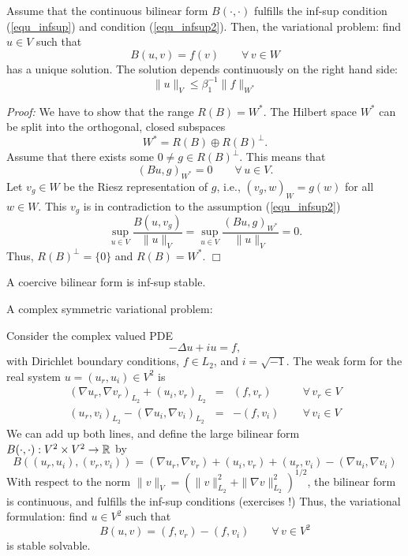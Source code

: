\begin{theorem} \label{theo_infsup} 
Assume that the continuous bilinear form $B(\cdot,\cdot)$ fulfills
the inf-sup condition (\ref{equ_infsup}) and condition (\ref{equ_infsup2}). 
Then, the variational problem: find $u \in V$ such that
\begin{equation} \label{equ_bigsystem}
B(u,v) = f(v) \qquad \forall \, v \in W
\end{equation}
has a unique solution. The solution depends continuously on the right hand
side:
$$
\| u \|_V \leq \beta_1^{-1} \| f \|_{W^\ast}
$$
\end{theorem}
{\em Proof:} We have to show that the range $R(B) = W^\ast$. The Hilbert
space $W^\ast$ can be split into the orthogonal, closed subspaces
$$
W^\ast = R(B) \oplus R(B)^\bot.
$$
Assume that there exists some $0 \neq g \in R(B)^\bot$. This means that
$$
(B u, g)_{W^\ast} = 0 \qquad \forall \, u \in V.
$$
Let $v_g \in W$ be the Riesz representation of $g$, i.e., $(v_g, w)_W = g(w)$ for all $w \in W$. This $v_g$ is in contradiction to the assumption 
(\ref{equ_infsup2})
$$
\sup_{u \in V} \frac{B(u,v_g)}{ \| u \|_V} = 
\sup_{u \in V} \frac{(Bu,g)_{W^\ast}}{ \| u \|_V} = 
0.
$$
Thus, $R(B)^\bot = \{ 0 \}$ and $R(B) = W^\ast$.
\hfill $\Box$

\begin{example}A coercive bilinear form is inf-sup stable.
\end{example}
\begin{example}A complex symmetric variational problem:
\end{example}
\noindent
Consider the complex valued PDE 
$$
-\Delta u + i u = f,
$$
with Dirichlet boundary conditions, $f \in L_2$, and $i = \sqrt{-1}$. The
weak form for the real system $u = (u_{r}, u_i) \in V^2$ is
\begin{equation}
\begin{array}{rcll}
(\nabla u_{r}, \nabla v_{r})_{L_2} + (u_i, v_{r})_{L_2} & = &
        (f,v_{r}) \qquad & \forall \, v_r \in V \\
(u_{r}, v_i)_{L_2} -(\nabla u_i, \nabla v_i)_{L_2} & = &
        -(f,v_i) & \forall \, v_i \in V
\end{array}
\end{equation}
We can add up both lines, and define the large bilinear form $B(\cdot,\cdot) : V^2 \times V^2 \rightarrow {\mathbb R}$ by
$$
B ((u_r,u_i), (v_r, v_i)) = 
(\nabla u_{r}, \nabla v_{r}) + (u_i, v_{r}) + (u_{r}, v_i) -(\nabla u_i, \nabla v_i)
$$
With respect to the norm $\|v\|_V = ( \| v \|_{L_2}^2 + \| \nabla v \|_{L_2}^2)^{1/2}$, the bilinear form is continuous, and fulfills the inf-sup conditions
(exercises !)
Thus, the variational formulation: find $u \in V^2$ such that
$$
B(u,v) = (f,v_r) - (f,v_i) \qquad \forall \, v \in V^2
$$
is stable solvable.

